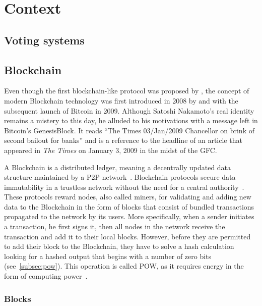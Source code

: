 \chapter{Context}\label{ch:context}

\section{Voting systems}\label{sec:voting-systems}

\section{Blockchain}\label{sec:blockchain}

Even though the first blockchain-like protocol was proposed by \textcite{chaum_computer_1982}, the concept of modern \gls{Blockchain} technology was first introduced in 2008 by \textcite{nakamoto_bitcoin_2008} and with the subsequent launch of Bitcoin in 2009.
Although Satoshi Nakamoto's real identity remains a mistery to this day, he alluded to his motivations with a message left in Bitcoin's \gls{GenesisBlock}.
It reads \enquote{The Times 03/Jan/2009 Chancellor on brink of second bailout for banks} and is a reference to the headline of an article that appeared in \emph{The Times} on January 3, 2009 in the midst of the \gls{GFC}.

A \gls{Blockchain} is a distributed ledger, meaning a decentrally updated data structure maintained by a \gls{P2P} network~\autocites[3]{crosby_blockchain_2015}[1]{nakamoto_bitcoin_2008}.
\Gls{Blockchain} protocols secure data immutability in a trustless network without the need for a central authority~\autocites[3]{crosby_blockchain_2015}[4]{jafar_blockchain_2021}.
These protocols reward nodes, also called miners, for validating and adding new data to the \gls{Blockchain} in the form of blocks that consist of bundled transactions propagated to the network by its users.
More specifically, when a sender initiates a transaction, he first signs it, then all nodes in the network receive the transaction and add it to their local blocks.
However, before they are permitted to add their block to the \gls{Blockchain}, they have to solve a hash calculation looking for a hashed output that begins with a number of zero bits (see~\cref{subsec:pow}).
This operation is called \gls{POW}, as it requires energy in the form of computing power~\autocite[3]{nakamoto_bitcoin_2008}.

\subsection{Blocks}\label{subsec:blocks}

